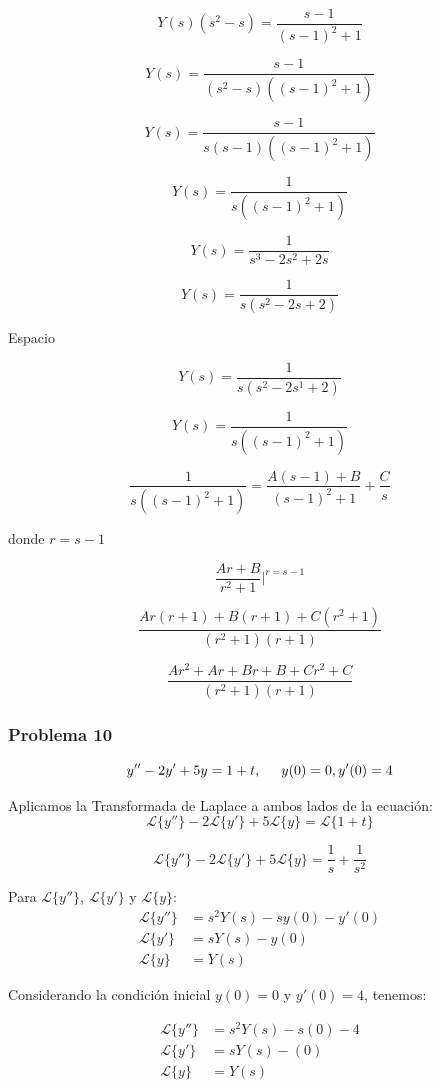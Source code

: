 \documentclass{article}
\begin{document}
\[
    Y(s)(s^2 - s) = \frac{s-1}{(s-1)^2 + 1}
\]

\[
    Y(s) = \frac{s-1}{(s^2 - s)((s-1)^2 + 1)}
\]

\[
    Y(s) = \frac{s-1}{s(s - 1)((s-1)^2 + 1)}
\]

\[
    Y(s) = \frac{1}{s((s-1)^2 + 1)}
\]

\[
    Y(s) = \frac{1}{s^3 - 2s^2 + 2s}
\]

\[
    Y(s) = \frac{1}{s(s^2-2s+2)}
\]

Espacio

\[
    Y(s) = \frac{1}{s(s^2 - 2s^1 + 2)}
\]

\[
    Y(s) = \frac{1}{s((s-1)^2 + 1)}
\]

\[
    \frac{1}{s((s-1)^2 + 1)} = \frac{A(s-1) + B}{(s-1)^2 + 1} + \frac{C}{s}
\]

donde $r = s-1$

\[
    \frac{Ar + B}{r^2 + 1} |^{r=s-1}
\]

\[
    \frac{Ar(r+1) + B(r+1) + C(r^2 + 1)}{(r^2 + 1)(r + 1)}
\]

\[
    \frac{Ar^2 + Ar + Br + B + Cr^2 + C}{(r^2 + 1)(r + 1)}
\]

\newpage


\subsubsection{Problema 10}
\[y'' - 2y' + 5y = 1 + t, \hspace{.5cm} y(0) = 0, y'(0) = 4\]

Aplicamos la Transformada de Laplace a ambos lados de la ecuación:
\[
    \mathcal{L}\{y''\} - 2\mathcal{L}\{y'\} + 5\mathcal{L}\{y\} = \mathcal{L}\{1 + t\}
\]

\[
    \mathcal{L}\{y''\} - 2\mathcal{L}\{y'\} + 5\mathcal{L}\{y\} = \frac{1}{s} + \frac{1}{s^2}
\]

Para \(\mathcal{L}\{y''\}\), \(\mathcal{L}\{y'\}\) y \(\mathcal{L}\{y\}\):
\begin{align*}
    \mathcal{L}\{y''\} & = s^2Y(s) - sy(0) - y'(0) \\
    \mathcal{L}\{y'\}  & = sY(s) - y(0)            \\
    \mathcal{L}\{y\}   & = Y(s)
\end{align*}

Considerando la condición inicial $y(0) = 0$ y $y'(0) = 4$, tenemos:

\begin{align*}
    \mathcal{L}\{y''\} & = s^2Y(s) - s(0) - 4 \\
    \mathcal{L}\{y'\}  & = sY(s) - (0)        \\
    \mathcal{L}\{y\}   & = Y(s)
\end{align*}
\end{document}
